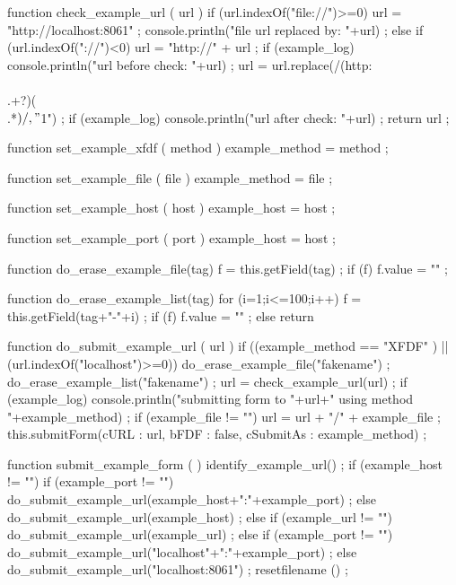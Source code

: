     function check_example_url ( url ) {
        if (url.indexOf("file://")>=0) {
            url = "http://localhost:8061" ;
            console.println("file url replaced by: "+url) ;
        } else {
            if (url.indexOf("://")<0) {
                url = "http://" + url ;
            }
            if (example_log) {
                console.println("url before check: "+url) ;
            }
            url = url.replace(/(http:\\\/\\\/.+?)(\\\/.*$)/, "$1") ;
            if (example_log) {
                console.println("url after check: "+url) ;
            }
        }
        return url ;
    }

    function set_example_xfdf ( method ) {
        example_method = method ;
    }

    function set_example_file ( file ) {
        example_method = file ;
    }

    function set_example_host ( host ) {
        example_host = host ;
    }

    function set_example_port ( port ) {
        example_host = host ;
    }

    function do_erase_example_file(tag) {
        f = this.getField(tag) ;
        if (f) {
            f.value = "" ;
        }
    }

    function do_erase_example_list(tag) {
        for (i=1;i<=100;i++) {
            f = this.getField(tag+"-"+i) ;
            if (f) {
                f.value = "" ;
            } else {
                return
            }
        }
    }

    function do_submit_example_url ( url ) {
        if ((example_method == "XFDF" ) || (url.indexOf("localhost")>=0)) {
            do_erase_example_file("fakename") ;
            do_erase_example_list("fakename") ;
        }
        url = check_example_url(url) ;
        if (example_log) {
            console.println("submitting form to "+url+" using method "+example_method) ;
        }
        if (example_file != "") {
            url = url + "/" + example_file ;
        }
        this.submitForm({cURL : url, bFDF : false, cSubmitAs : example_method}) ;
    }

    function submit_example_form ( ) {
        identify_example_url() ;
        if (example_host != "") {
            if (example_port != "") {
                do_submit_example_url(example_host+":"+example_port) ;
            } else {
                do_submit_example_url(example_host) ;
            }
        } else {
            if (example_url != "") {
                do_submit_example_url(example_url) ;
            } else {
                if (example_port != "") {
                    do_submit_example_url("localhost"+":"+example_port) ;
                } else {
                    do_submit_example_url("localhost:8061") ; %
                }
            }
        }
        resetfilename () ;
    }

